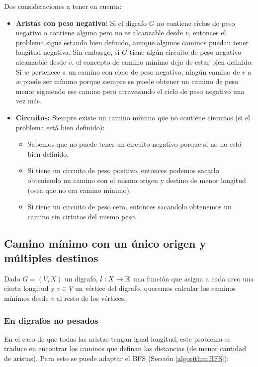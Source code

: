 Dos consideraciones a tener en cuenta:
\begin{itemize}
  \item \textbf{Aristas con peso negativo:} Si el digrafo \(G\) no contiene ciclos de peso negativo o contiene alguno pero no es alcanzable desde \(v\), entonces el problema sigue estando bien definido, aunque algunos caminos puedan tener longitud negativa. Sin embargo, si \(G\) tiene algún circuito de peso negativo alcanzable desde \(v\), el concepto de camino mínimo deja de estar bien definido: Si \(w\) pertenece a un camino con ciclo de peso negativo, ningún camino de \(v\) a \(w\) puede ser mínimo porque siempre se puede obtener un camino de peso menor siguiendo ese camino pero atravesando el ciclo de peso negativo una vez más.
  \item \textbf{Circuitos:} Siempre existe un camino mínimo que no contiene circuitos (si el problema está bien definido):
        \begin{itemize}
          \item Sabemos que no puede tener un circuito negativo porque si no no está bien definido.
          \item Si tiene un circuito de peso positivo, entonces podemos sacarlo obteniendo un camino con el mismo origen y destino de menor longitud (osea que no era camino mínimo).
          \item Si tiene un circuito de peso cero, entonces sacandolo obtenemos un camino sin cirtutos del mismo peso.
        \end{itemize}
\end{itemize}

\subsection{Camino mínimo con un único origen y múltiples destinos}
Dado \(G = (V, X)\) un digrafo, \(l: X\to\mathbb{R}\) una función que asigna a cada arco una cierta longitud y \(v\in V\) un vértice del digrafo, queremos calcular los caminos mínimos desde \(v\) al resto de los vértices.

\subsubsection{En digrafos no pesados}
En el caso de que todas las aristas tengan igual longitud, este problema se traduce en encontrar los caminos que definan las distancias (de menor cantidad de aristas). Para esto se puede adaptar el BFS (Sección \ref{algorithm:BFS}):

